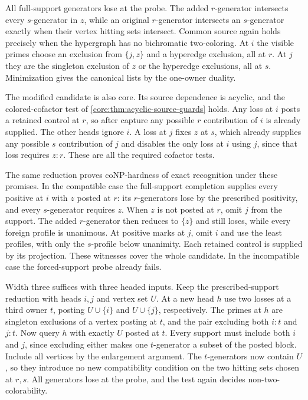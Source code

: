 All full-support generators lose at the probe. The added
$r$-generator intersects every $s$-generator in $z$, while an
original $r$-generator intersects an $s$-generator exactly when
their vertex hitting sets intersect. Common source again holds
precisely when the hypergraph has no bichromatic two-coloring.
At $i$ the visible primes choose an exclusion from $\{j,z\}$
and a hyperedge exclusion, all at $r$. At $j$ they are the
singleton exclusion of $z$ or the hyperedge exclusions, all at
$s$. Minimization gives the canonical lists by the one-owner
duality.

The modified candidate is also core. Its source dependence is
acyclic, and the colored-cofactor test of
\cref{core:thm:acyclic-source-guards} holds. Any loss at $i$
posts a retained control at $r$, so after capture any possible
$r$ contribution of $i$ is already supplied. The other heads
ignore $i$. A loss at $j$ fixes $z$ at $s$, which already supplies
any possible $s$ contribution of $j$ and disables the only loss
at $i$ using $j$, since that loss requires $z:r$. These are all
the required cofactor tests.

The same reduction proves coNP-hardness of exact recognition
under these promises. In the compatible case the full-support
completion supplies every positive at $i$ with $z$ posted at
$r$: its $r$-generators lose by the prescribed positivity, and
every $s$-generator requires $z$. When $z$ is not posted at
$r$, omit $j$ from the support. The added $r$-generator then
reduces to $\{z\}$ and still loses, while every foreign profile
is unanimous. At positive marks at $j$, omit $i$ and use the
least profiles, with only the $s$-profile below unanimity.
Each retained control is supplied by its projection. These
witnesses cover the whole candidate. In the incompatible case
the forced-support probe already fails.

Width three suffices with three headed inputs. Keep the
prescribed-support reduction with heads $i,j$ and vertex set
$U$. At a new head $h$ use two losses at a third owner $t$,
posting $U\cup\{i\}$ and $U\cup\{j\}$, respectively.
The primes at $h$ are singleton exclusions of a vertex
posting at $t$, and the pair excluding both $i:t$ and $j:t$.
Now query $h$ with exactly $U$ posted at $t$. Every support
must include both $i$ and $j$, since excluding either makes
one $t$-generator a subset of the posted block. Include all
vertices by the enlargement argument. The $t$-generators now
contain $U$, so they introduce no new compatibility condition
on the two hitting sets chosen at $r,s$. All generators lose
at the probe, and the test again decides non-two-colorability.

